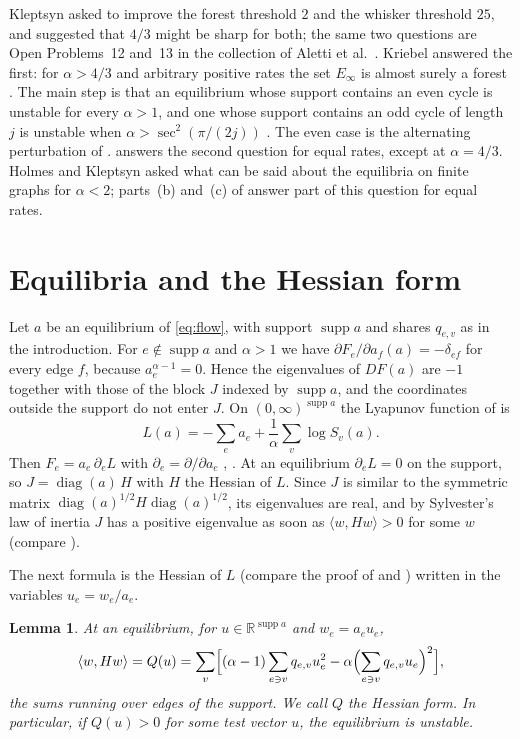 \documentclass[11pt]{article}
\newtheorem{lemma}[theorem]{Lemma}
\theoremstyle{definition}
\theoremstyle{remark}
\DeclareMathOperator{\supp}{supp}
\DeclareMathOperator{\diag}{diag}
\begin{document}
Kleptsyn \cite[Open Problems~1 and 2, p.~655]{Kl} asked to improve the forest threshold $2$ and the whisker
threshold $25$, and suggested that $4/3$ might be sharp for both; the same two questions are Open Problems~12
and~13 in the collection of Aletti et al.\ \cite{AOP}. Kriebel answered the first: for $\alpha>4/3$ and arbitrary
positive rates the set $E_\infty$ is almost surely a forest \cite[Theorem~1(1)]{Kr}. The main step is that an
equilibrium whose support contains an even cycle is unstable for every $\alpha>1$, and one whose support contains
an odd cycle of length $j$ is unstable when $\alpha>\sec^2(\pi/(2j))$ \cite[Theorem~3]{Kr}. The even case is the
alternating perturbation of \cite[Lemma~2]{HHK}.  answers the second question for equal rates, except at $\alpha=4/3$.
Holmes and Kleptsyn \cite[Section~1.4, Question~1]{HK} asked what can be said about the equilibria on finite graphs
for $\alpha<2$; parts~(b) and~(c) of  answer part of this question for equal rates.

\section{Equilibria and the Hessian form}\label{sec:prelim}

Let $a$ be an equilibrium of \eqref{eq:flow}, with support $\supp a$ and shares $q_{e,v}$ as in the introduction.
For $e\notin\supp a$ and $\alpha>1$ we have $\partial F_e/\partial a_f(a)=-\delta_{ef}$ for every edge $f$, because
$a_e^{\alpha-1}=0$. Hence the eigenvalues of $DF(a)$ are $-1$ together with those of the block $J$ indexed by
$\supp a$, and the coordinates outside the support do not enter $J$. On $(0,\infty)^{\supp a}$ the Lyapunov
function of \cite[(A.4)]{vdHHKR} is
\[
  L(a)=-\sum_{e}a_e+\frac1\alpha\sum_v\log S_v(a).
\]
Then $F_e=a_e\,\partial_eL$ with $\partial_e=\partial/\partial a_e$ \cite[(A.5)]{vdHHKR}, \cite[Lemma~1, Corollary~4]{HK}. At an equilibrium $\partial_eL=0$
on the support, so $J=\diag(a)\,H$ with $H$ the Hessian of $L$. Since $J$ is similar to the symmetric matrix
$\diag(a)^{1/2}H\diag(a)^{1/2}$, its eigenvalues are real, and by Sylvester's law of inertia $J$ has a positive
eigenvalue as soon as $\langle w,Hw\rangle>0$ for some $w$ (compare \cite[Corollary~5]{HK}).

The next formula is the Hessian of $L$ (compare the proof of \cite[Proposition~1]{HK} and \cite[Section~3]{Kr}) written in the variables
$u_e=w_e/a_e$.

\begin{lemma}\label{lem:Q}
At an equilibrium, for $u\in\mathbb R^{\supp a}$ and $w_e=a_eu_e$,
\[
  \langle w,Hw\rangle=Q(u)=\sum_v\Bigl[(\alpha-1)\sum_{e\ni v}q_{e,v}u_e^2-\alpha\Bigl(\sum_{e\ni v}q_{e,v}u_e\Bigr)^2\Bigr],
\]
the sums running over edges of the support. We call $Q$ the \emph{Hessian form}. In particular, if $Q(u)>0$ for
some test vector $u$, the equilibrium is unstable.
\end{lemma}
\end{document}
